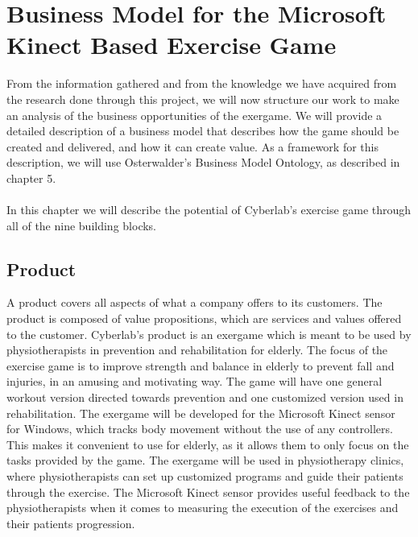 \chapter{Business Model for the Microsoft Kinect Based Exercise Game}
From the information gathered and from the knowledge we have acquired from the research done through this project, we will now structure our work to make an analysis of the business opportunities of the exergame. We will provide a detailed description of a business model that describes how the game should be created and delivered, and how it can create value. As a framework for this description, we will use Osterwalder's Business Model Ontology, as described in chapter 5. \\ \\ 
In this chapter we will describe the potential of Cyberlab's exercise game through all of the nine building blocks.  

\section{Product}
A product covers all aspects of what a company offers to its customers. The product is composed of value propositions, which are services and values offered to the customer. Cyberlab’s product is an exergame which is meant to be used by physiotherapists in prevention and rehabilitation for elderly. The focus of the exercise game is to improve strength and balance in elderly to prevent fall and injuries, in an amusing and motivating way. The game will have one general workout version directed towards prevention and one customized version used in rehabilitation. The exergame will be developed for the Microsoft Kinect sensor for Windows, which tracks body movement without the use of any controllers. This makes it convenient to use for elderly, as it allows them to only focus on the tasks provided by the game. The exergame will be used in physiotherapy clinics, where physiotherapists can set up customized programs and guide their patients through the exercise. The Microsoft Kinect sensor provides useful feedback to the physiotherapists when it comes to measuring the execution of the exercises and their patients progression. 

